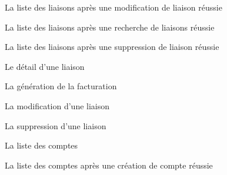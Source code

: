 \documentclass[a4paper,french,8pt]{article}
\begin{document}
		\begin{figure}[h!]
			\caption{La liste des liaisons après une modification de liaison réussie}
			\centering
		\end{figure} 
		
		\begin{figure}[h!]
			\caption{La liste des liaisons après une recherche de liaisons réussie}
			\centering
		\end{figure}
		
		\begin{figure}[h!]
			\caption{La liste des liaisons après une suppression de liaison réussie}
			\centering
		\end{figure} 

		\begin{figure}[h!]
			\caption{Le détail d'une liaison}
			\centering
		\end{figure}
			

		
		\begin{figure}[h!]
			\caption{La génération de la facturation}
			\centering
		\end{figure} 
		
		\begin{figure}[h!]
			\caption{La modification d'une liaison}
			\centering
		\end{figure} 
		
		
		
		\begin{figure}[h!]
			\caption{La suppression d'une liaison}
			\centering
		\end{figure}
		
			
		\begin{figure}[h!]
			\caption{La liste des comptes}
			\centering
		\end{figure} 
		
		\begin{figure}[h!]
			\caption{La liste des comptes après une création de compte réussie}
			\centering
		\end{figure}
		
\end{document}
